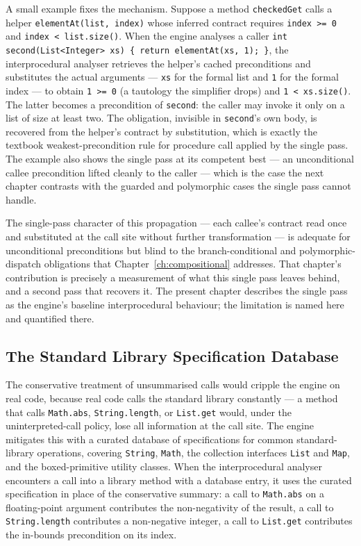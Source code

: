 A small example fixes the mechanism. Suppose a method \texttt{checkedGet} calls a
helper \texttt{elementAt(list, index)} whose inferred contract requires
\texttt{index >= 0} and \texttt{index < list.size()}. When the engine analyses a
caller \texttt{int second(List<Integer> xs) \{ return elementAt(xs, 1); \}}, the
interprocedural analyser retrieves the helper's cached preconditions and
substitutes the actual arguments --- \texttt{xs} for the formal list and
\texttt{1} for the formal index --- to obtain \texttt{1 >= 0} (a tautology the
simplifier drops) and \texttt{1 < xs.size()}. The latter becomes a precondition of
\texttt{second}: the caller may invoke it only on a list of size at least two. The
obligation, invisible in \texttt{second}'s own body, is recovered from the helper's
contract by substitution, which is exactly the textbook weakest-precondition rule
for procedure call applied by the single pass. The example also shows the single
pass at its competent best --- an unconditional callee precondition lifted cleanly
to the caller --- which is the case the next chapter contrasts with the guarded and
polymorphic cases the single pass cannot handle.

The single-pass character of this propagation --- each callee's contract read
once and substituted at the call site without further transformation --- is
adequate for unconditional preconditions but blind to the branch-conditional
and polymorphic-dispatch obligations that Chapter~\ref{ch:compositional}
addresses. That chapter's contribution is precisely a measurement of what this
single pass leaves behind, and a second pass that recovers it. The present
chapter describes the single pass as the engine's baseline interprocedural
behaviour; the limitation is named here and quantified there.

\subsection{The Standard Library Specification Database}

The conservative treatment of unsummarised calls would cripple the engine on real
code, because real code calls the standard library constantly --- a method that
calls \texttt{Math.abs}, \texttt{String.length}, or \texttt{List.get} would, under
the uninterpreted-call policy, lose all information at the call site. The engine
mitigates this with a curated database of specifications for common standard-
library operations, covering \texttt{String}, \texttt{Math}, the collection
interfaces \texttt{List} and \texttt{Map}, and the boxed-primitive utility
classes. When the interprocedural analyser encounters a call into a library method
with a database entry, it uses the curated specification in place of the
conservative summary: a call to \texttt{Math.abs} on a floating-point argument
contributes the non-negativity of the result, a call to \texttt{String.length}
contributes a non-negative integer, a call to \texttt{List.get} contributes the
in-bounds precondition on its index.

